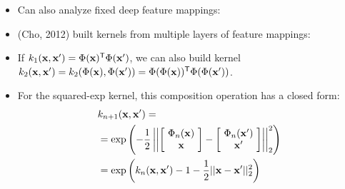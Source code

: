 \documentclass[portrait,a0b,final,a4resizeable]{include/a0poster}
\begin{document}
\begin{poster}
\begin{multicols}{2}
\begin{minipage}[c]{0.6\columnwidth}

\begin{itemize}
\item Can also analyze fixed deep feature mappings:
\item {\color{mydarkblue} (Cho, 2012) } built kernels from multiple layers of feature mappings:
\item If ${k_1({\bf{x}}, {\bf{x}}') = \Phi({\bf{x}}) {^\mathsf{T}} \Phi({\bf{x}}')}$, we can also build kernel ${k_2({\bf{x}}, {\bf{x}}') = k_2(\Phi({\bf{x}}), \Phi({\bf{x}}')) = \Phi(\Phi({\bf{x}})) {^\mathsf{T}} \Phi(\Phi({\bf{x}}'))}$.
%

\item For the squared-exp kernel, this composition operation has a closed form:%
%
%
%
%
%
\begin{align*}
& k_{n+1}({\bf{x}}, {\bf{x}}') = \nonumber \\
& = \exp \left( -\frac{1}{2} \left|\left| \left[ \! \begin{array}{c} \Phi_n({\bf{x}}) \\ {\bf{x}} \end{array} \! \right]  - \left[ \! \begin{array}{c} \Phi_n({\bf{x}}') \\ {\bf{x}}' \end{array} \! \right] \right| \right|_2^2 \right) \nonumber \\
& = \exp \left( k_n({\bf{x}}, {\bf{x}}') - 1 -\frac{1}{2} || {\bf{x}} - {\bf{x}}' ||_2^2 \right)
\end{align*}


\end{itemize}
\end{minipage}
\end{multicols}
\end{poster}
\end{document}
